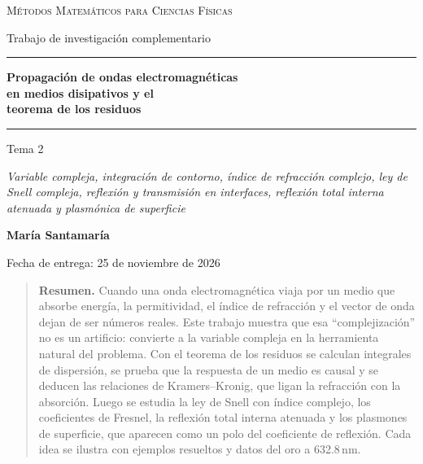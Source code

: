 \documentclass[11pt,letterpaper]{article}
\newcounter{ejemplo}
\begin{document}
\begin{titlepage}
  \centering
  \vspace*{3.2cm}
  {\textsc{Métodos Matemáticos para Ciencias Físicas}\par}
  \vspace{0.4cm}
  {Trabajo de investigación complementario\par}
  \vspace{2.6cm}
  \rule{0.8\textwidth}{0.4pt}\par
  \vspace{0.7cm}
  {\LARGE\bfseries Propagación de ondas electromagnéticas\\[0.25em]
   en medios disipativos y el\\[0.25em] teorema de los residuos\par}
  \vspace{0.6cm}
  \rule{0.8\textwidth}{0.4pt}\par
  \vspace{0.6cm}
  {\large Tema 2\par}
  \vspace{0.15cm}
  {\small\itshape Variable compleja, integración de contorno, índice de
   refracción complejo, ley de Snell compleja, reflexión y transmisión en
   interfaces, reflexión total interna atenuada y plasmónica de superficie\par}
  \vfill
  {\large\bfseries María Santamaría\par}
  \vspace{0.4cm}
  {Fecha de entrega: 25 de noviembre de 2026\par}
  \vspace{2.2cm}
\end{titlepage}
\setcounter{page}{1}

\begin{quote}
\small
\textbf{Resumen.} Cuando una onda electromagnética viaja por un medio que
absorbe energía, la permitividad, el índice de refracción y el vector de onda
dejan de ser números reales. Este trabajo muestra que esa
``complejización'' no es un artificio: convierte a la variable compleja en la
herramienta natural del problema. Con el teorema de los residuos se calculan
integrales de dispersión, se prueba que la respuesta de un medio es causal y
se deducen las relaciones de Kramers--Kronig, que ligan la refracción con la
absorción. Luego se estudia la ley de Snell con índice complejo, los
coeficientes de Fresnel, la reflexión total interna atenuada y los plasmones
de superficie, que aparecen como un polo del coeficiente de reflexión. Cada
idea se ilustra con ejemplos resueltos y datos del oro a 632.8\,nm.
\end{quote}
\end{document}
